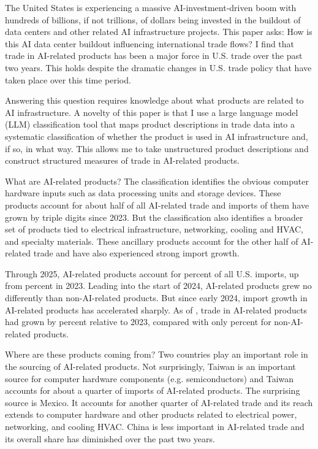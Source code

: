 \documentclass[12pt,pdftex]{article}
\begin{document}
\begin{onehalfspacing}
\hspace{-0.05cm}

\newpage

The United States is experiencing a massive AI-investment-driven boom with hundreds of billions, if not trillions, of dollars being invested in the buildout of data centers and other related AI infrastructure projects. This paper asks: How is this AI data center buildout influencing international trade flows? I find that trade in AI-related products has been a major force in U.S. trade over the past two years. This holds despite the dramatic changes in U.S. trade policy that have taken place over this time period. 

Answering this question requires knowledge about what products are related to AI infrastructure. A novelty of this paper is that I use a large language model (LLM) classification tool that maps product descriptions in trade data into a systematic classification of whether the product is used in AI infrastructure and, if so, in what way. This allows me to take unstructured product descriptions and construct structured measures of trade in AI-related products.

What are AI-related products? The classification identifies the obvious computer hardware inputs such as data processing units and storage devices. These products account for about half of all AI-related trade and imports of them have grown by triple digits since 2023. But the classification also identifies a broader set of products tied to electrical infrastructure, networking, cooling and HVAC, and specialty materials. These ancillary products account for the other half of AI-related trade and have also experienced strong import growth.

Through 2025, AI-related products account for \aiShareTwentyFive{} percent of all U.S. imports, up from \aiShareTwentyThree{} percent in 2023. Leading into the start of 2024, AI-related products grew no differently than non-AI-related products. But since early 2024, import growth in AI-related products has accelerated sharply. As of \lastObsDate{}, trade in AI-related products had grown by \totalHighAiPctChange{} percent relative to 2023, compared with only \lowAiPctChange{} percent for non-AI-related products.

Where are these products coming from? Two countries play an important role in the sourcing of AI-related products. Not surprisingly, Taiwan is an important source for computer hardware components (e.g. semiconductors) and Taiwan accounts for about a quarter of imports of AI-related products. The surprising source is Mexico. It accounts for another quarter of AI-related trade and its reach extends to computer hardware and other products related to electrical power, networking, and cooling HVAC. China is less important in AI-related trade and its overall share has diminished over the past two years. 


\end{onehalfspacing}
\end{document}

